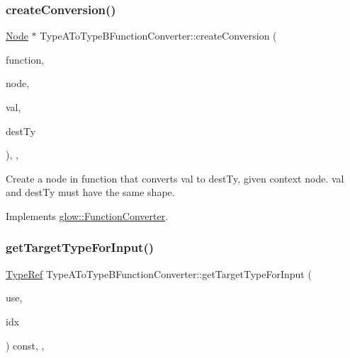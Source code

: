 \subsubsection{\texorpdfstring{create\+Conversion()}{createConversion()}}
{\footnotesize\ttfamily \hyperlink{classglow_1_1_node}{Node} $\ast$ Type\+A\+To\+Type\+B\+Function\+Converter\+::create\+Conversion (\begin{DoxyParamCaption}\item[{\hyperlink{classglow_1_1_function}{Function} \&}]{function,  }\item[{const \hyperlink{classglow_1_1_node}{Node} \&}]{node,  }\item[{\hyperlink{structglow_1_1_node_value}{Node\+Value} \&}]{val,  }\item[{\hyperlink{structglow_1_1_type}{Type\+Ref}}]{dest\+Ty }\end{DoxyParamCaption})\hspace{0.3cm}{\ttfamily [override]}, {\ttfamily [protected]}, {\ttfamily [virtual]}}

Create a node in {\ttfamily function} that converts {\ttfamily val} to {\ttfamily dest\+Ty}, given context {\ttfamily node}. {\ttfamily val} and {\ttfamily dest\+Ty} must have the same shape. 

Implements \hyperlink{classglow_1_1_function_converter_a03251a5ce1b3485e0fa5dd70faaa0a35}{glow\+::\+Function\+Converter}.

\mbox{\label{classglow_1_1_type_a_to_type_b_function_converter_a19c5372966cc435b4043c0b9f7f014b8}} 
\subsubsection{\texorpdfstring{get\+Target\+Type\+For\+Input()}{getTargetTypeForInput()}}
{\footnotesize\ttfamily \hyperlink{structglow_1_1_type}{Type\+Ref} Type\+A\+To\+Type\+B\+Function\+Converter\+::get\+Target\+Type\+For\+Input (\begin{DoxyParamCaption}\item[{const \hyperlink{classglow_1_1_node}{Node} \&}]{use,  }\item[{unsigned}]{idx }\end{DoxyParamCaption}) const\hspace{0.3cm}{\ttfamily [override]}, {\ttfamily [protected]}, {\ttfamily [virtual]}}

